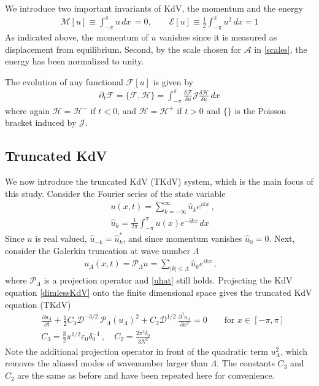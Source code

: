 \documentclass[11pt]{article}
\newcommand{\pd}[2]    { \frac{\partial #1} {\partial #2} }
\newcommand{\abs}[1]{\left| #1 \right|}
\newcommand{\eps}{\varepsilon}
\newcommand{\dx}{\, dx}
\newcommand{\lamfac}{N}
\newcommand{\drat}{\mathcal{D}}
\newcommand{\En}{\mathcal{E}}
\newcommand{\Mo}{\mathcal{M}}
\newcommand{\ampscale}{\mathcal{A}}
\newcommand{\epsup}{\eps_0}
\newcommand{\delup}{\delta_0}
\newcommand{\uhat}{\hat{u}}
\newcommand{\sympJ}{\mathcal{J}}
\newcommand{\vard}[2]{\frac{\delta #1}{\delta #2}}
\newcommand{\Ham}{\mathcal{H}}
\newcommand{\Hup}{\Ham^{-}}
\newcommand{\Hdn}{\Ham^{+}}
\newcommand{\Proj}{\mathcal{P}_{\Lambda}}
\newcommand{\uL}{u_{\Lambda}}
\begin{document}
We introduce two important invariants of KdV, the momentum and the energy
\begin{align}
\label{MomEn}
\Mo[u] \equiv \int_{-\pi}^{\pi} u \dx \, = 0 , \qquad
\En[u] \equiv \frac{1}{2} \int_{-\pi}^{\pi} u^2 \dx = 1
\end{align}
As indicated above, the momentum of $u$ vanishes since it is measured as displacement from equilibrium. Second, by the scale chosen for $\ampscale$ in \eqref{scales}, the energy has been normalized to unity.

The evolution of any functional $\mathcal{F}[u]$ is given by 
\begin{align}
\partial_t \mathcal{F} = \{ \mathcal{F}, \Ham \} = \int_{-\pi}^{\pi} \vard{\mathcal{F}}{u} \sympJ \vard{\Ham}{u} \dx
\end{align}
where again $\Ham = \Hup$ if $t<0$, and $\Ham = \Hdn$ if $t>0$ and $\{\}$ is the Poisson bracket induced by $\sympJ$.



\subsection{Truncated KdV}
\label{tKdVSec}

We now introduce the truncated KdV (TKdV) system, which is the main focus of this study. Consider the Fourier series of the state variable
\begin{align}
&u(x,t) = \sum_{k=-\infty}^{\infty} \uhat_k e^{i k x} \, , \\
\label{uhat}
&\uhat_k = \frac{1}{2 \pi} \int_{-\pi}^{\pi} u(x) e^{-i k x} \dx
\end{align}
Since $u$ is real valued, $\uhat_{-k} = \uhat_{k}^*$, and since momentum vanishes $\uhat_0 = 0$.
Next, consider the Galerkin truncation at wave number $\Lambda$
\begin{align}
\uL(x,t) = \Proj u =
\sum_{\abs{k} \le \Lambda} \uhat_k e^{i k x} \, , \qquad
\end{align}
where $\Proj$ is a projection operator and \eqref{uhat} still holds. Projecting the KdV equation \eqref{dimlessKdV} onto the finite dimensional space gives the truncated KdV equation (TKdV)
\begin{align}
\label{TKdV}
&\pd{\uL}{t} +  \frac{1}{2} C_3 \drat^{-3/2} \,\Proj (\uL)^2 + C_2 \drat^{1/2} \, \frac{\partial^3 \uL}{\partial x^3} = 0
\qquad \text{for } x \in [-\pi,\pi] \\
&C_3 = \frac{3}{2} \pi^{1/2} \epsup \delup^{-1} \, , \quad
C_2 = \frac{2 \pi^2 \delup}{3 \lamfac^2}
\end{align}
Note the additional projection operator in front of the quadratic term $\uL^2$, which removes the aliased modes of wavenumber larger than $\Lambda$. The constants $C_3$ and $C_2$ are the same as before and have been repeated here for convenience. 
\end{document}
